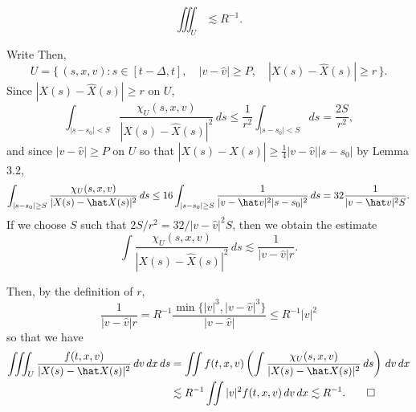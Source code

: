 \documentclass{article}
\begin{document}
\begin{prop}
\[\iiint_U\lesssim R^{-1}.\]
\end{prop}
\begin{pf}
Write
Then,
\[U=\{\,(s,x,v):s\in[t-\Delta,t],\quad|v-\hat v|\ge P,\quad |X(s)-\hat X(s)|\ge r\,\}.\]
Since $|X(s)-\hat X(s)|\ge r$ on $U$,
\[\int_{|s-s_0|<S}\frac{\chi_U(s,x,v)}{|X(s)-\hat X(s)|^2}\,ds
\le\frac1{r^2}\int_{|s-s_0|<S}ds=\frac{2S}{r^2},\]
and since $|v-\hat v|\ge P$ on $U$ so that $|X(s)-\hat X(s)|\ge\frac14|v-\hat v||s-s_0|$ by Lemma 3.2,
\[\int_{|s-s_0|\ge S}\frac{\chi_U(s,x,v)}{|X(s)-\hat X(s)|^2}\,ds
\le16\int_{|s-s_0|\ge S}\frac1{|v-\hat v|^2|s-s_0|^2}\,ds\\
=32\frac1{|v-\hat v|^2S}.\]
If we choose $S$ such that $2S/r^2=32/|v-\hat v|^2S$, then we obtain the estimate
\[\int\frac{\chi_U(s,x,v)}{|X(s)-\hat X(s)|^2}\,ds\lesssim\frac1{|v-\hat v|r}.\]

Then, by the definition of $r$, 
\[\frac1{|v-\hat v|r}=R^{-1}\frac{\min\{|v|^3,|v-\hat v|^3\}}{|v-\hat v|}\le R^{-1}|v|^2\]
so that we have
\begin{align*}
\iiint_U\frac{f(t,x,v)}{|X(s)-\hat X(s)|^2}\,dv\,dx\,ds
&=\iint f(t,x,v)\left(\int\frac{\chi_U(s,x,v)}{|X(s)-\hat X(s)|^2}\,ds\right)\,dv\,dx\\
&\lesssim R^{-1}\iint|v|^2f(t,x,v)\,dv\,dx\lesssim R^{-1}.\qedhere
\end{align*}
\end{pf}
\end{document}
